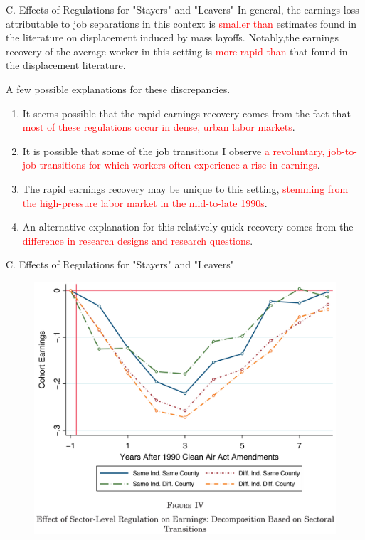 \documentclass{beamer}
\begin{document}
\begin{frame}{C. Effects of Regulations for "Stayers" and "Leavers"}
	In general, the earnings loss attributable to job separations in this context is \textcolor{red}{smaller than} estimates found in the literature on displacement induced by mass layoffs. Notably,the earnings recovery of the average worker in this setting is \textcolor{red}{more rapid than} that found in the displacement literature.
	\medskip

	A few possible explanations for these discrepancies.
	\begin{enumerate}
		\item It seems possible that the rapid earnings recovery comes from the fact that \textcolor{red}{most of these regulations occur in dense, urban labor markets}.
		\item It is possible that some of the job transitions I observe \textcolor{red}{a revoluntary, job-to-job transitions for which workers often experience a rise in earnings}.
		\item The rapid earnings recovery may be unique to this setting, \textcolor{red}{stemming from the high-pressure labor market in the mid-to-late 1990s}.
		\item An alternative explanation for this relatively quick recovery comes from the \textcolor{red}{difference in research designs and research questions}.
	\end{enumerate}
\end{frame}
\begin{frame}{C. Effects of Regulations for "Stayers" and "Leavers"}
	\begin{figure}[h]
		\centering
		\includegraphics[scale=0.37]{figure4.png}
	\end{figure}
\end{frame}
\end{document}
